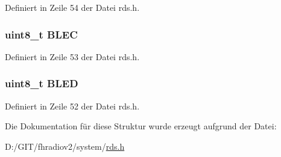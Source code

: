 Definiert in Zeile 54 der Datei rds.\+h.

\hypertarget{structerr_a279b7213c9f5034e0fa7aa8d9c2bc9a2}{}
\subsubsection[{B\+L\+E\+C}]{\setlength{\rightskip}{0pt plus 5cm}uint8\+\_\+t B\+L\+E\+C}\label{structerr_a279b7213c9f5034e0fa7aa8d9c2bc9a2}


Definiert in Zeile 53 der Datei rds.\+h.

\hypertarget{structerr_a3498d51c8fc84119a00242f7bb9b6719}{}
\subsubsection[{B\+L\+E\+D}]{\setlength{\rightskip}{0pt plus 5cm}uint8\+\_\+t B\+L\+E\+D}\label{structerr_a3498d51c8fc84119a00242f7bb9b6719}


Definiert in Zeile 52 der Datei rds.\+h.



Die Dokumentation für diese Struktur wurde erzeugt aufgrund der Datei\+:\begin{DoxyCompactItemize}
\item 
D\+:/\+G\+I\+T/fhradiov2/system/\hyperlink{rds_8h}{rds.\+h}\end{DoxyCompactItemize}
